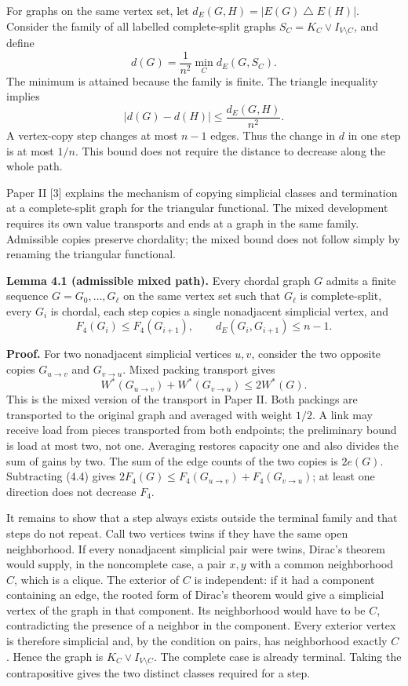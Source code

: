 \documentclass[english,11pt,a4paper]{article}
\begin{document}
For graphs on the same vertex set, let \(d_E(G,H)=|E(G)\mathbin{\triangle}E(H)|\). Consider the family of all labelled complete-split graphs \(S_C=K_C\vee I_{V\setminus C}\), and define \[
d(G)=\frac1{n^2}\min_C d_E(G,S_C).
\] The minimum is attained because the family is finite. The triangle inequality implies \[
|d(G)-d(H)|\le\frac{d_E(G,H)}{n^2}.
\tag{4.2}
\] A vertex-copy step changes at most \(n-1\) edges. Thus the change in \(d\) in one step is at most \(1/n\). This bound does not require the distance to decrease along the whole path.

Paper II {[}3{]} explains the mechanism of copying simplicial classes and termination at a complete-split graph for the triangular functional. The mixed development requires its own value transports and ends at a graph in the same family. Admissible copies preserve chordality; the mixed bound does not follow simply by renaming the triangular functional.


\textbf{Lemma 4.1 (admissible mixed path).} Every chordal graph \(G\) admits a finite sequence \(G=G_0,\ldots,G_\ell\) on the same vertex set such that \(G_\ell\) is complete-split, every \(G_i\) is chordal, each step copies a single nonadjacent simplicial vertex, and \[
F_4(G_i)\le F_4(G_{i+1}),\qquad
d_E(G_i,G_{i+1})\le n-1.
\tag{4.3}
\]

\textbf{Proof.} For two nonadjacent simplicial vertices \(u,v\), consider the two opposite copies \(G_{u\to v}\) and \(G_{v\to u}\). Mixed packing transport gives \[
W^*(G_{u\to v})+W^*(G_{v\to u})\le2W^*(G).
\tag{4.4}
\] This is the mixed version of the transport in Paper II. Both packings are transported to the original graph and averaged with weight \(1/2\). A link may receive load from pieces transported from both endpoints; the preliminary bound is load at most two, not one. Averaging restores capacity one and also divides the sum of gains by two. The sum of the edge counts of the two copies is \(2e(G)\). Subtracting (4.4) gives \(2F_4(G)\le F_4(G_{u\to v})+F_4(G_{v\to u})\); at least one direction does not decrease \(F_4\).

It remains to show that a step always exists outside the terminal family and that steps do not repeat. Call two vertices twins if they have the same open neighborhood. If every nonadjacent simplicial pair were twins, Dirac's theorem would supply, in the noncomplete case, a pair \(x,y\) with a common neighborhood \(C\), which is a clique. The exterior of \(C\) is independent: if it had a component containing an edge, the rooted form of Dirac's theorem would give a simplicial vertex of the graph in that component. Its neighborhood would have to be \(C\), contradicting the presence of a neighbor in the component. Every exterior vertex is therefore simplicial and, by the condition on pairs, has neighborhood exactly \(C\). Hence the graph is \(K_C\vee I_{V\setminus C}\). The complete case is already terminal. Taking the contrapositive gives the two distinct classes required for a step.
\end{document}
